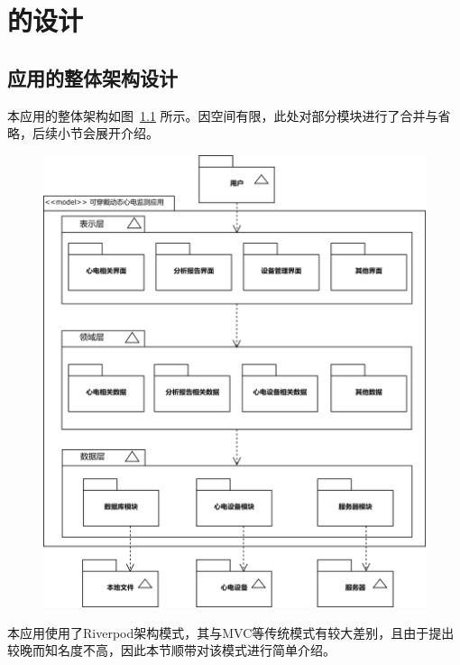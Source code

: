 

\chapter{\app 的设计}\label{ch:design}


\section{应用的整体架构设计}\label{sec:arch-design}

本应用的整体架构如图~\ref{fig:model} 所示。因空间有限，此处对部分模块进行了合并与省略，后续小节会展开介绍。

\begin{figure}[!ht]
    \includegraphics[width=\textwidth]{../assets/model.drawio}
    \label{fig:model}
\end{figure}

本应用使用了Riverpod架构模式\cite{bizzottoFlutterAppArchitecture}，其与MVC等传统模式有较大差别，且由于提出较晚而知名度不高，因此本节顺带对该模式进行简单介绍。

